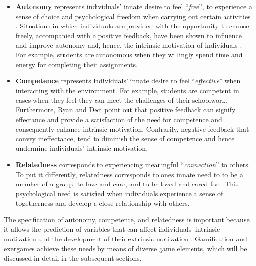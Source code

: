 \begin{itemize}
\item \textbf{Autonomy} represents individuals' innate desire to feel ``\textit{free}'', to experience a sense of choice and psychological freedom when carrying out certain activities \cite{deci2000and}. Situations in which individuals are provided with the opportunity to choose freely, accompanied with a positive feedback, have been shown to influence and improve autonomy and, hence, the intrinsic motivation of individuals \cite{ryan2000self}. For example, students are  autonomous when they willingly spend time and energy for completing their assignments. 
\item \textbf{Competence} represents individuals' innate desire to feel ``\textit{effective}'' when interacting with the environment. For example, students are competent in cases when they feel they can meet the challenges of their schoolwork. Furthermore, Ryan and Deci point out that positive feedback can signify effectance and provide a satisfaction of the need for competence and consequently enhance intrinsic motivation. Contrarily, negative feedback that convey ineffectance, tend to diminish the sense of competence and hence undermine individuals' intrinsic motivation. 
\item \textbf{Relatedness} corresponds to experiencing meaningful ``\textit{connection}'' to others. To put it differently, relatedness corresponds to ones innate need to to be a member of a group, to love and care, and to be loved and cared for \cite{broeck2010capturing}. This psychological need is satisfied when individuals experience a sense of togetherness and develop a close relationship with others.
\end{itemize}
The specification of autonomy, competence, and relatedness is important because it allows the prediction of variables that can affect individuals' intrinsic motivation and the development of their extrinsic motivation \cite{deci1994promoting}. Gamification and exergames achieve these needs by means of diverse game elements, which will be discussed in detail in the subsequent sections.\\
